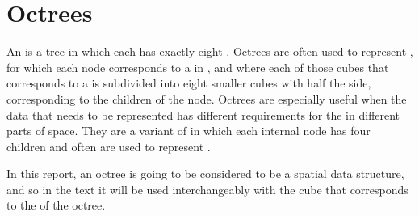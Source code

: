 \chapter{Octrees}
\label{chap:octrees}

An \octree is a tree  in which each  has exactly eight . Octrees are often used to represent , for which each node corresponds to a \cube in , and where each of those cubes that corresponds to a  is subdivided into eight smaller cubes with half the side, corresponding to the children of the node. Octrees are especially useful when the data that needs to be represented has different requirements for the \LOD in different parts of space. They are a variant of \quadtrees in which each internal node has four children and often are used to represent .

In this report, an octree is going to be considered to be a spatial data structure, and so in the text it will be used interchangeably with the cube that corresponds to the  of the octree.

